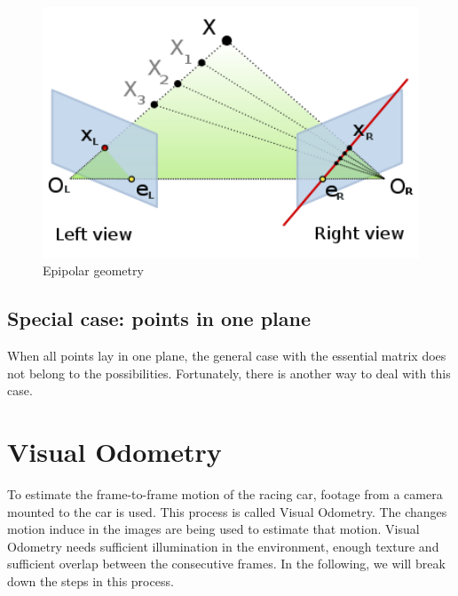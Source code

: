 \begin{figure}
    \centering
    \includegraphics[width=1\textwidth]{figures/epipolar_geometry.png}
    \caption{Epipolar geometry}
    \label{fig:epigeo}
\end{figure}

\subsection{Special case: points in one plane}
When all points lay in one plane, the general case with the essential matrix does not belong to the possibilities. Fortunately, there is another way to deal with this case. 

\section{Visual Odometry}
To estimate the frame-to-frame motion of the racing car, footage from a camera mounted to the car is used. This process is called Visual Odometry. The changes motion induce in the images are being used to estimate that motion. Visual Odometry needs sufficient illumination in the environment, enough texture and sufficient overlap between the consecutive frames. In the following, we will break down the steps in this process.


